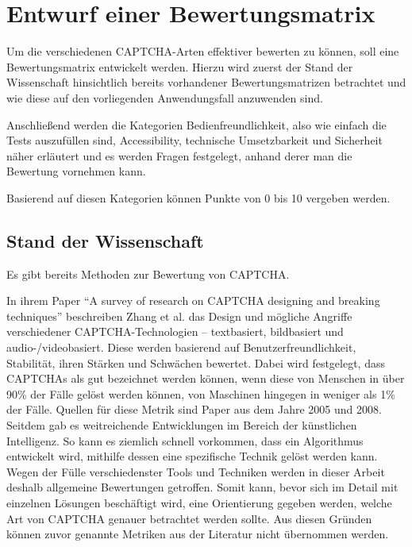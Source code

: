 \chapter{Entwurf einer Bewertungsmatrix}
\label{ch:matrix}

Um die verschiedenen CAPTCHA-Arten effektiver bewerten zu können, soll eine Bewertungsmatrix entwickelt werden.
Hierzu wird zuerst der Stand der Wissenschaft hinsichtlich bereits vorhandener Bewertungsmatrizen betrachtet
und wie diese auf den vorliegenden Anwendungsfall anzuwenden sind.

Anschließend werden die Kategorien Bedienfreundlichkeit, also wie einfach die Tests auszufüllen sind, Accessibility, technische Umsetzbarkeit
und Sicherheit näher erläutert und es werden Fragen festgelegt, anhand derer man die Bewertung vornehmen kann.

Basierend auf diesen Kategorien können Punkte von 0 bis 10 vergeben werden.

\section{Stand der Wissenschaft}
\label{ch:matrix:sdw}

Es gibt bereits Methoden zur Bewertung von CAPTCHA.

In ihrem Paper ``A survey of research on CAPTCHA designing and breaking techniques'' beschreiben Zhang et al. das Design
und mögliche Angriffe verschiedener CAPTCHA-Technologien – textbasiert, bildbasiert und audio-/videobasiert.
Diese werden basierend auf Benutzerfreundlichkeit, Stabilität, ihren Stärken und Schwächen bewertet.  
Dabei wird festgelegt, dass CAPTCHAs als gut bezeichnet werden können, wenn diese von Menschen in über 90\% der Fälle gelöst werden können,
von Maschinen hingegen in weniger als 1\% der Fälle.
Quellen für diese Metrik sind Paper aus dem Jahre 2005 und 2008. \cite[p.75]{surveyofresearch}
Seitdem gab es weitreichende Entwicklungen im Bereich der künstlichen Intelligenz.
So kann es ziemlich schnell vorkommen, dass ein Algorithmus entwickelt wird, mithilfe dessen eine spezifische Technik gelöst werden kann.
Wegen der Fülle verschiedenster Tools und Techniken werden in dieser Arbeit deshalb allgemeine Bewertungen getroffen.
Somit kann, bevor sich im Detail mit einzelnen Lösungen beschäftigt wird, eine Orientierung gegeben werden, welche Art von CAPTCHA genauer betrachtet werden sollte.
Aus diesen Gründen können zuvor genannte Metriken aus der Literatur nicht übernommen werden.

